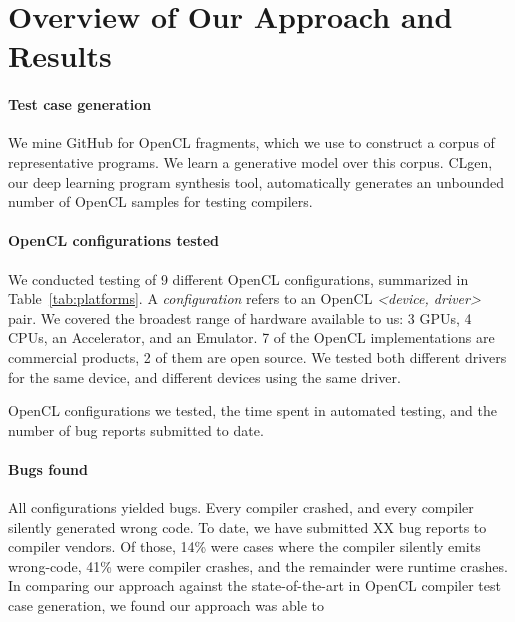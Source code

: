 \section{Overview of Our Approach and Results}\label{sec:overview}

\paragraph{Test case generation} We mine GitHub for OpenCL fragments, which we use to construct a corpus of representative programs. We learn a generative model over this corpus. CLgen, our deep learning program synthesis tool, automatically generates an unbounded number of OpenCL samples for testing compilers.

\paragraph{OpenCL configurations tested} We conducted testing of 9 different OpenCL configurations, summarized in Table~\ref{tab:platforms}. A \emph{configuration} refers to an OpenCL \emph{<device, driver>} pair. We covered the broadest range of hardware available to us: 3 GPUs, 4 CPUs, an Accelerator, and an Emulator. 7 of the OpenCL implementations are commercial products, 2 of them are open source. We tested both different drivers for the same device, and different devices using the same driver.


\begin{table*}[t!]
	\scriptsize %
	\centering %
	
	\caption{OpenCL configurations we tested, the time spent in automated testing, and the number of bug reports submitted to date.}
	\label{tab:platforms}
\end{table*}


\paragraph{Bugs found} All configurations yielded bugs. Every compiler crashed, and every compiler silently generated wrong code. To date, we have submitted XX bug reports to compiler vendors. Of those, 14\% were cases where the compiler silently emits wrong-code, 41\% were compiler crashes, and the remainder were runtime crashes. In comparing our approach against the state-of-the-art in OpenCL compiler test case generation, we found our approach was able to \cc{\ldots}